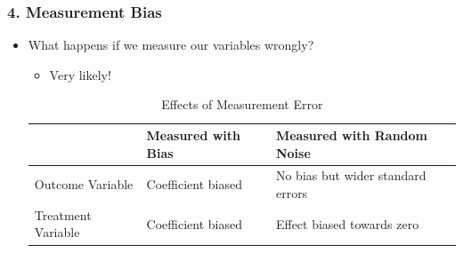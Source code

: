 \documentclass[xcolor=x11names,compress]{beamer}\usepackage[]{graphicx}\usepackage[]{color}
\renewcommand{\(}{\begin{columns}}
\renewcommand{\)}{\end{columns}}
\newcommand{\<}[1]{\begin{column}{#1}}
\renewcommand{\>}{\end{column}}
\begin{document}
\begin{frame}
\frametitle{4. Measurement Bias}
\begin{itemize}
\item What happens if we measure our variables wrongly?
\begin{itemize}
\item Very likely!
\end{itemize}
\footnotesize
\begin{table}[htbp]
  \centering
  \caption{Effects of Measurement Error}
    \begin{tabular}{|l|l|p{4cm}|}
    \hline
          & Measured with \textbf{Bias} & Measured with \textbf{Random Noise} \bigstrut\\
    \hline
    Outcome Variable & Coefficient biased & No bias but wider standard errors \bigstrut\\
    \hline
    Treatment Variable & Coefficient biased & Effect biased towards zero \bigstrut\\
    \hline
    \end{tabular}%
  \label{tab:addlabel}%
\end{table}%
\normalsize
\end{itemize}
\end{frame}
\end{document}
